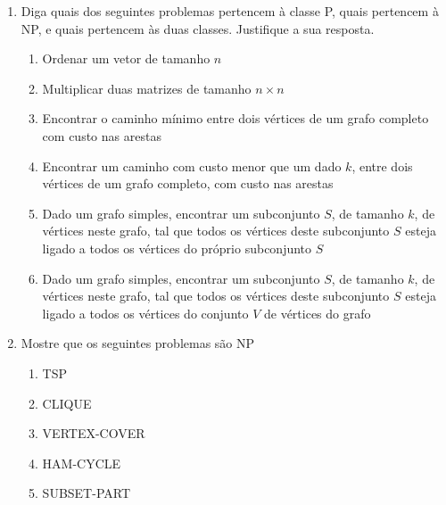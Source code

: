 \documentclass[12pt]{article}
\begin{document}
\begin{enumerate}

\item Diga quais dos seguintes problemas pertencem à classe P, quais pertencem à NP, e quais pertencem às duas classes. Justifique a sua resposta.

\begin{enumerate}

\item Ordenar um vetor de tamanho $n$

\item Multiplicar duas matrizes de tamanho $n\times n$

\item Encontrar o caminho mínimo entre dois vértices de um grafo completo com custo nas arestas

\item Encontrar um caminho com custo menor que um dado $k$, entre dois vértices de um grafo completo, com custo nas arestas

\item Dado um grafo simples, encontrar um subconjunto $S$, de tamanho $k$, de vértices neste grafo, tal que todos os vértices deste subconjunto $S$ esteja ligado a todos os vértices do próprio subconjunto $S$

\item Dado um grafo simples, encontrar um subconjunto $S$, de tamanho $k$, de vértices neste grafo, tal que todos os vértices deste subconjunto $S$ esteja ligado a todos os vértices do conjunto $V$ de vértices do grafo

\end{enumerate}


\item Mostre que os seguintes problemas são NP

\begin{enumerate}

\item TSP

\item CLIQUE

\item VERTEX-COVER

\item HAM-CYCLE

\item SUBSET-PART

\end{enumerate}




\break



\end{enumerate}
\end{document}
